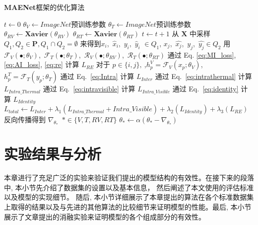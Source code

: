 \begin{algorithm}
  \caption{\textbf{MAENet}框架的优化算法}\label{algo:main}
  $t \leftarrow 0$\;
  $\theta_V \leftarrow ImageNet预训练参数$  \; 
  $\theta_T \leftarrow ImageNet预训练参数$  \; 
  $\theta_{RV} \leftarrow \textbf{Xavier}(\theta_{RV})$  \; 
  $\theta_{RT} \leftarrow \textbf{Xavier}(\theta_{RT})$  \; 
  {
    $t \leftarrow t +1 $\;
   从 $\mathbf{X}$ 中采样 $Q_1, Q_2 \in \mathbf{P}, Q_1 \cap Q_2 = \emptyset $ 来得到$x_i$,~$\hat{x}_i$,~$y_i$,~$\hat{y}_i$ $\in  Q_1$, $x_j$,~$\hat{x_j}$,~${y_j}$,~$\hat{y_j} \in Q_2$ \;
   用 ~$\mathcal{F}_V(\bullet;\theta_V)$,~$\mathcal{F}_T(\bullet;\theta_T)$,~$\mathcal{R}_V(\bullet;\theta_{RV})$,~$\mathcal{R}_T(\bullet;\theta_{RT})$ 通过 Eq. \ref{eq:MI_loss}, \ref{eq:AI_loss}, \ref{eq:re} 计算 $L_{RE}$  \;
   对于 $p \in \{i, j\},~$,$h_p^V = \mathcal{F}_V(x_p;\theta_V)$, $h_p^T = \mathcal{F}_T(y_p;\theta_T)$ \;
   通过 Eq.~\ref{eq:Intra} 计算 $L_{Inter}$ \;
   通过 Eq.~\ref{eq:intrathermal} 计算 $L_{Intra\_Thermal}$ \;
   通过 Eq.~\ref{eq:intravisible} 计算 $L_{Intra\_Visible}$ \;
   通过 Eq.~\ref{eq:identity} 计算 $L_{Identity}$ \;
   $L_{total} \leftarrow L_{Inter} + \lambda_1 (L_{Intra\_Thermal} + Intra\_Visible) + \lambda_2 (L_{Identity}) + \lambda_3 (L_{RE}) $ \;
   反向传播得到 $\nabla_{\theta_*}$~$*\in \{V, T, RV, RT\}$ \;
  $\theta_* \leftarrow \alpha ( \theta_* - \nabla_{\theta_*}) $ \;
  }
 
  \end{algorithm}

\section{实验结果与分析}
本章进行了充足广泛的实验来验证我们提出的模型结构的有效性。在接下来的段落中, 本小节先介绍了数据集的设置以及基本信息， 然后阐述了本文使用的评估标准以及模型的实现细节。 随后, 本小节详细展示了本章提出的算法在各个标准数据集上取得的结果以及与先进的其他算法的比较细节来证明模型的性能。最后, 本小节展示了文章提出的消融实验来证明模型的各个组成部分的有效性。
